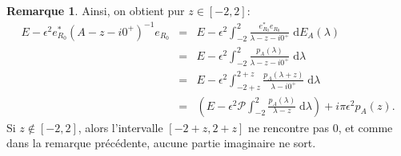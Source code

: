 \documentclass[12pt,openany,a4paper, titlepage]{article}
\newcommand{\f}[2]{\frac{#1}{#2}}
\newcommand{\lp}{\left(}
\newcommand{\rp}{\right)}
\newcommand{\dd}{\;\mathrm{d}}
\theoremstyle{definition}
\theoremstyle{definition}
\theoremstyle{definition}
\theoremstyle{definition}
\theoremstyle{definition}
\newtheorem{rem}{Remarque}
\theoremstyle{definition}
\begin{document}
\begin{rem}
Ainsi, on obtient pur $z\in[-2,2]$:
\begin{eqnarray}
    E - \epsilon^2 e_{R_0}^*(A-z -i0^+)^{-1}e_{R_0} &=& E - \epsilon^2 \int_{-2}^2\f{e_{R_0}^*e_{R_0}}{\lambda - z - i0^+} \dd E_A(\lambda) \\ 
    &=& E -  \epsilon^2 \int_{-2}^2\f{p_A(\lambda)}{\lambda - z - i0^+} \dd \lambda \\
    &=& E -  \epsilon^2 \int_{-2+z}^{2+z}\f{p_A(\lambda + z)}{\lambda - i0^+} \dd \lambda \\
    &=& \lp E - \epsilon^2 \mathcal{P} \int_{-2}^2\f{p_A(\lambda)}{\lambda - z} \dd{\lambda} \rp + i\pi\epsilon^2  p_A(z).
\end{eqnarray}
Si $z\notin [-2,2]$, alors l'intervalle $[-2+z,2+z]$ ne rencontre pas $0$, et comme dans la remarque précédente, aucune partie imaginaire ne sort. 


\end{rem}
\end{document}
